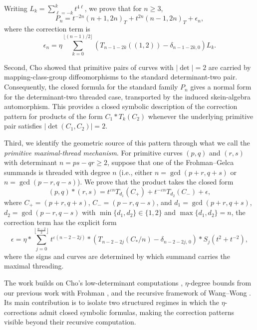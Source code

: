 \documentclass[12pt]{article}
\begin{document}
Writing $L_k = \sum_{\ell=-k}^{k} t^{4\ell}$, we prove that for $n\ge 3$,
\begin{equation}\label{eq:intro-Pn-main}
P_n = t^{-2n}(n+1,2n)_T + t^{2n}(n-1,2n)_T + \epsilon_n,
\end{equation}
where the correction term is
\begin{equation}\label{eq:intro-Pn-eps}
\epsilon_n = \eta \sum_{k=0}^{\lfloor (n-1)/2\rfloor} \left( T_{n-1-2k}((1,2)) - \delta_{n-1-2k,0} \right) L_k.
\end{equation}





Second, Cho \cite{cho} showed that primitive pairs of curves with $|\det|=2$ are carried by mapping-class-group diffeomorphisms to the standard determinant-two pair. Consequently, the closed formula for the standard family $P_n$ gives a normal form for the determinant-two threaded case, transported by the induced skein-algebra automorphism. This provides a closed symbolic description of the correction pattern for products of the form $C_1\ast T_k(C_2)$ whenever the underlying primitive pair satisfies $|\det(C_1,C_2)|=2$.


Third, we identify the geometric source of this pattern through what we call the \emph{primitive maximal-thread mechanism}. For primitive curves $(p,q)$ and $(r,s)$ with determinant $n = ps-qr \geq 2$, suppose that one of the Frohman--Gelca summands is threaded with degree $n$ (i.e., either $n = \gcd(p + r, q + s)$ or $n = \gcd(p - r, q - s)$). We prove that the product takes the closed form
\[
(p,q) \ast (r,s) = t^{\varepsilon n} T_{d_1}(C_+) + t^{-\varepsilon n} T_{d_2}(C_-) + \epsilon,
\]
where $C_+ = (p + r, q + s)$, $C_- = (p - r, q - s)$, and $d_1 = \gcd(p + r, q + s)$, $d_2 = \gcd(p - r, q - s)$ with $\min\{d_1, d_2\} \in \{1, 2\}$ and $\max\{d_1, d_2\} = n$, the correction term has the explicit form
\[
\epsilon = \eta \ast \sum_{j = 0}^{\left\lfloor \frac{n-2}{2} \right\rfloor} t^{\varepsilon(n - 2 - 2j)} \ast \left( T_{n - 2 - 2j}(C_*/n) - \delta_{n - 2 - 2j, \, 0} \right) \ast S_j\left(t^2 + t^{-2}\right),
\]
where the signs and curves are determined by which summand carries the maximal threading. 

The work builds on Cho's low-determinant computations \cite{cho}, 
$\eta$-degree bounds from our previous work with Frohman \cite{abdiel2014}, and the recursive framework of Wang--Wong \cite{wangwong}. Its main contribution is to isolate two structured regimes in which the $\eta$-corrections admit closed symbolic formulas, making the correction patterns visible beyond their recursive computation.
\end{document}
